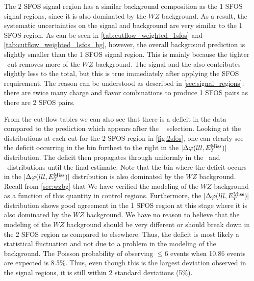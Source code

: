 The 2 SFOS signal region has a similar background composition as
the 1 SFOS signal regions, since it is also dominated by 
the $WZ$ background.  As a result, the systematic uncertainties
on the signal and background are very similar to the 1 SFOS region.
As can be seen
in
\tab\ref{tab:cutflow_weighted_1sfos}
and 
\tab\ref{tab:cutflow_weighted_1sfos_bg},
however,
the overall background prediction
is slightly smaller than the 1 SFOS signal region.
This is 
mainly because the tighter \MET~cut removes more of the $WZ$ background.
The signal and the 
also contributes slightly less to the total,
but this is true
immediately after applying the SFOS requirement.
The reason can be understood 
as described in \sec\ref{sec:signal_regions}:
there are twice many charge and flavor combinations to produce
1 SFOS pairs as there are 2 SFOS pairs.


From the cut-flow tables we can also see that there is a deficit in the data
compared to the prediction which appears after the \deltaphi~
selection. Looking at the distributions at each cut for 
the 2 SFOS region in \fig\ref{fig:2sfos},
one can clearly see the deficit occurring in the bin
furthest to the right in the $|\Delta\varphi(lll,E_{T}^{\textrm{Miss}})|$ distribution.
The deficit then propagates through uniformly in the 
\njet~and \nmu~distributions until the final estimate.
Note that the bin where the deficit occurs in the $|\Delta\varphi(lll,E_{T}^{\textrm{Miss}})|$
distribution is also dominated by the $WZ$ background.
Recall from \sec\ref{sec:wzbg} that 
We have verified the modeling of the $WZ$ background
as a function of this quantity in control regions. 
Furthermore, the $|\Delta\varphi(lll,E_{T}^{\textrm{Miss}})|$ distribution
shows good agreement in the 1 SFOS region at this stage
where it is also dominated by the $WZ$ background.
We have no reason to believe that the modeling of the $WZ$
background should be very different or should 
break down in the 2 SFOS region as compared to elsewhere.
Thus, the deficit is most likely a statistical fluctuation
and not due to a problem in the modeling of the 
background.
The Poisson probability of observing $\leq 6$ events
when 10.86 events are expected is 8.5\%.
Thus, even though this is the largest deviation observed in the signal
regions, it is still within 2 standard deviations (5\%).


